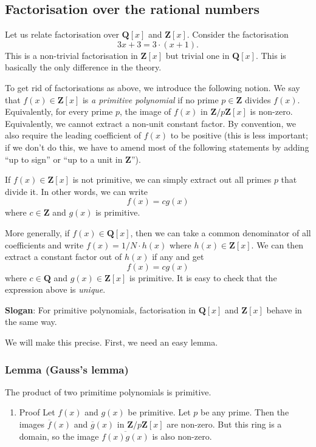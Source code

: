 \documentclass[11pt]{article}
\begin{document}
\subsection{Factorisation over the rational numbers}
\label{sec:orgd50f4ea}
Let us relate factorisation over \(\mathbf{Q}[x]\) and \(\mathbf{Z}[x]\).
Consider the factorisation
\[ 3x+3 = 3 \cdot (x+1).\]
This is a non-trivial factorisation in \(\mathbf{Z}[x]\) but trivial one in \(\mathbf{Q}[x]\).
This is basically the only difference in the theory.

To get rid of factorisations as above, we introduce the following notion.
We say that \(f(x) \in \mathbf{Z}[x]\) is \emph{a primitive polynomial} if no prime \(p \in \mathbf{Z}\) divides \(f(x)\).
Equivalently, for every prime \(p\), the image of \(f(x)\) in \(\mathbf{Z}/p \mathbf{Z}[x]\) is non-zero.
Equivalently, we cannot extract a non-unit constant factor.
By convention, we also require the leading coefficient of \(f(x)\) to be positive (this is less important; if we don't do this, we have to amend most of the following statements by adding ``up to sign'' or ``up to a unit in \(\mathbf{Z}\)'').

If \(f(x)\in \mathbf{Z}[x]\) is not primitive, we can simply extract out all primes \(p\) that divide it.
In other words, we can write
\[ f(x) = c g(x)\]
where \(c \in \mathbf{Z}\) and \(g(x)\) is primitive.

More generally, if \(f(x) \in \mathbf{Q}[x]\), then we can take a common denominator of all coefficients and write \(f(x) = 1/N \cdot h(x)\) where \(h(x) \in \mathbf{Z}[x]\).
We can then extract a constant factor out of \(h(x)\) if any and get
\[ f(x) = c g(x) \]
where \(c \in \mathbf{Q}\) and \(g(x) \in \mathbf{Z}[x]\) is primitive.
It is easy to check that the expression above is \emph{unique}.

\textbf{Slogan}: For primitive polynomials, factorisation in \(\mathbf{Q}[x]\) and \(\mathbf{Z}[x]\) behave in the same way.

We will make this precise.
First, we need an easy lemma.
\subsubsection{Lemma (Gauss's lemma)}
\label{sec:orga8c6b79}
The product of two primitime polynomials is primitive.
\begin{enumerate}
\item Proof
\label{sec:org7f3f03c}
Let \(f(x)\) and \(g(x)\) be primitive.
Let \(p\) be any prime.
Then the images \(\overline f(x)\) and \(\overline g(x)\) in \(\mathbf{Z}/p \mathbf{Z} [x]\) are non-zero.
But this ring is a domain, so the image \(\overline {f(x)g(x)}\) is also non-zero.
\end{enumerate}
\end{document}
